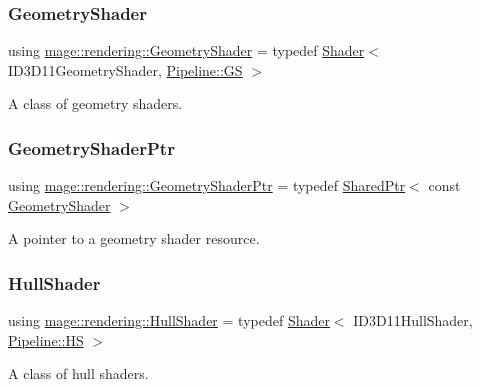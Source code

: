 \subsubsection{\texorpdfstring{Geometry\+Shader}{GeometryShader}}
{\footnotesize\ttfamily using \mbox{\hyperlink{namespacemage_1_1rendering_accaa3591de8a0d7a2c72c1dcc0cf9592}{mage\+::rendering\+::\+Geometry\+Shader}} = typedef \mbox{\hyperlink{classmage_1_1rendering_1_1_shader}{Shader}}$<$ I\+D3\+D11\+Geometry\+Shader, \mbox{\hyperlink{structmage_1_1rendering_1_1_pipeline_1_1_g_s}{Pipeline\+::\+GS}} $>$}

A class of geometry shaders. \mbox{\label{namespacemage_1_1rendering_aa5d63f80f9483d0896718813768ba1cf}} 
\subsubsection{\texorpdfstring{Geometry\+Shader\+Ptr}{GeometryShaderPtr}}
{\footnotesize\ttfamily using \mbox{\hyperlink{namespacemage_1_1rendering_aa5d63f80f9483d0896718813768ba1cf}{mage\+::rendering\+::\+Geometry\+Shader\+Ptr}} = typedef \mbox{\hyperlink{namespacemage_a1e01ae66713838a7a67d30e44c67703e}{Shared\+Ptr}}$<$ const \mbox{\hyperlink{namespacemage_1_1rendering_accaa3591de8a0d7a2c72c1dcc0cf9592}{Geometry\+Shader}} $>$}

A pointer to a geometry shader resource. \mbox{\label{namespacemage_1_1rendering_aa133f36cd1a81c87eedf962270a12f48}} 
\subsubsection{\texorpdfstring{Hull\+Shader}{HullShader}}
{\footnotesize\ttfamily using \mbox{\hyperlink{namespacemage_1_1rendering_aa133f36cd1a81c87eedf962270a12f48}{mage\+::rendering\+::\+Hull\+Shader}} = typedef \mbox{\hyperlink{classmage_1_1rendering_1_1_shader}{Shader}}$<$ I\+D3\+D11\+Hull\+Shader, \mbox{\hyperlink{structmage_1_1rendering_1_1_pipeline_1_1_h_s}{Pipeline\+::\+HS}} $>$}

A class of hull shaders. \mbox{\label{namespacemage_1_1rendering_a6f33b2e1ea7f2ae3824dc7fb6875c655}} 
